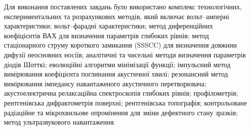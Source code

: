 {\MethodTXT}
Для виконання поставлених завдань було використано комплекс технологічних, експериментальних та розрахункових методів, який включає
вольт--амперні характеристики;
вольт--фарадні характеристики;
метод диференційних коефіцієнтів ВАХ для визначення параметрів глибоких рівнів;
метод стаціонарного струму короткого замикання (SSSCC) для визначення довжини дифузії неосновних носіїв;
аналітичні та чисельні методи визначення параметрів діодів Шотткі;
еволюційні алгоритми мінімізації функції;
імпульсний метод вимірювання коефіцієнта поглинання акустичної хвилі;
резонансний метод вимірювання імпедансу навантаженого акустичного перетворювача;
акустоелектрична релаксаційна спектроскопія глибоких рівнів;
профілометрія;
рентгенівська дифрактометрія поверхні;
рентгенівська топографія;
контрольоване радіаційне та мікрохвильове опромінення для зміни дефектного стану зразків;
метод ультразвукового навантаження.



